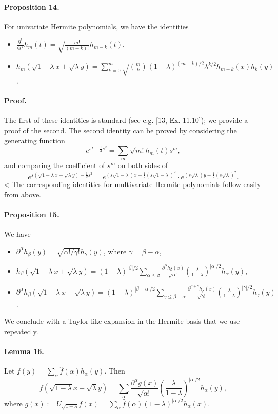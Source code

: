 \documentclass[10pt,a4paper]{article}
\begin{document}
\paragraph{Proposition 14.} For univariate Hermite polynomials, we have the identities
\begin{itemize}
\item $\frac{\partial^k}{\partial t^k}h_m(t)=\sqrt{\frac{m!}{(m-k)!}}h_{m-k}(t)$,
\item $h_m(\sqrt{1-\lambda}x+\sqrt\lambda y)=\sum_{k=0}^m\sqrt{\binom mk}(1-\lambda)^{(m-k)/2}\lambda^{k/2}h_{m-k}(x)h_k(y)$.
\end{itemize}
\paragraph{Proof.} The first of these identities is standard (see e.g. [13, Ex. 11.10]); we provide a proof of the second.
The second identity can be proved by considering the generating function
\[e^{st-\frac12s^2}=\sum_m\sqrt{m!}h_m(t)s^m,\]
and comparing the coefficient of $s^m$ on both sides of
\[e^{s(\sqrt{1-\lambda}x+\sqrt\lambda y)-\frac12s^2}=e^{(s\sqrt{1-\lambda})x-\frac12(s\sqrt{1-\lambda})^2}\cdot e^{(s\sqrt\lambda)y-\frac12(s\sqrt\lambda)^2}.\]\hfill$\triangleleft$
The corresponding identities for multivariate Hermite polynomials follow easily from above.
\paragraph{Proposition 15.} We have
\begin{itemize}
\item $\partial^\alpha h_\beta(y)=\sqrt{\alpha!/\gamma!}h_\gamma(y)$, where $\gamma=\beta-\alpha$,
\item $h_\beta(\sqrt{1-\lambda}x+\sqrt\lambda y)=(1-\lambda)^{|\beta|/2}\sum_{\alpha\leq\beta}\frac{\partial^\alpha h_\beta(x)}{\sqrt{\alpha!}}\left(\frac\lambda{1-\lambda}\right)^{|\alpha|/2}h_\alpha(y)$,
\item $\partial^\alpha h_\beta(\sqrt{1-\lambda}x+\sqrt\lambda y)=(1-\lambda)^{|\beta-\alpha|/2}\sum_{\gamma\leq\beta-\alpha}\frac{\partial^{\alpha+\gamma}h_\beta(x)}{\sqrt{\gamma!}}\left(\frac\lambda{1-\lambda}\right)^{|\gamma|/2}h_\gamma(y)$.
\end{itemize}
We conclude with a Taylor-like expansion in the Hermite basis that we use repeatedly.
\paragraph{Lemma 16.} Let $f(y)=\sum_\alpha\widehat f(\alpha)h_\alpha(y)$. Then
\[f(\sqrt{1-\lambda}x+\sqrt\lambda y)=\sum_\alpha\frac{\partial^\alpha g(x)}{\sqrt{\alpha!}}\left(\frac\lambda{1-\lambda}\right)^{|\alpha|/2}h_\alpha(y),\]
where $g(x):=U_{\sqrt{1-\lambda}}f(x)=\sum_\alpha\widehat f(\alpha)(1-\lambda)^{|\alpha|/2}h_\alpha(x)$.
\end{document}
